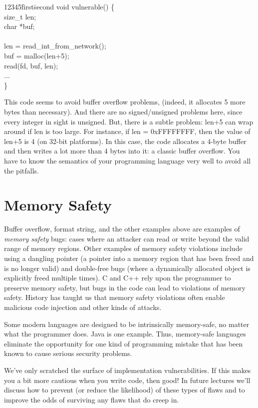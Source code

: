 \documentclass[11pt]{article}
\begin{document}
\begin{ttfamily}
\begin{tabbing}
12345\=first\=second \kill
void vulnerable() \{ \\
\>size\_t len; \\
\>char *buf; \\
\\
\>len = read\_int\_from\_network(); \\
\>buf = malloc(len+5); \\
\>read(fd, buf, len); \\
\>... \\
\}\\
\end{tabbing}
\end{ttfamily}

This code seems to avoid buffer overflow problems, (indeed, it
allocates 5 more bytes than necessary).  And there are no signed/unsigned
problems here, since every integer in sight is unsigned.
But, there is a subtle
problem: len+5 can wrap around if len is too large. For instance, if
len = 0xFFFFFFFF, then the value of len+5 is 4 (on 32-bit
platforms). In this case, the code allocates a 4-byte buffer and then
writes a lot more than 4 bytes into it: a classic buffer overflow. You
have to know the semantics of your programming language very well to
avoid all the pitfalls.

\section{Memory Safety}

Buffer overflow, format string, and the other examples above are
examples of \textit{memory safety} bugs: cases where an attacker can read or
write beyond the valid range of memory regions. Other examples of
memory safety violations include using a dangling pointer (a pointer
into a memory region that has been freed and is no longer valid) and
double-free bugs (where a dynamically allocated object is explicitly
freed multiple times).  C and C++ rely upon the programmer to preserve
memory safety, but bugs in the code can lead to violations of memory
safety.  History has taught us that memory safety violations often
enable malicious code injection and other kinds of attacks.  

Some modern languages are designed to be intrinsically memory-safe, no
matter what the programmer does. Java is one example. Thus,
memory-safe languages eliminate the opportunity for one kind of
programming mistake that has been known to cause serious security
problems.  

We've only scratched the surface of implementation
vulnerabilities. If this makes you a bit more cautious when you write
code, then good! In future lectures we'll discuss how to prevent (or
reduce the likelihood) of these types of flaws and to improve the odds
of surviving any flaws that do creep in.
\end{document}
